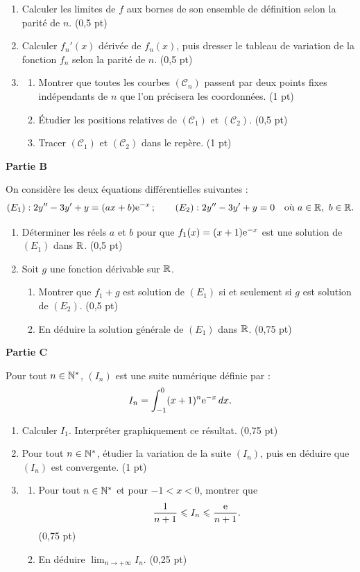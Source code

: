 \begin{enumerate}
	\item Calculer les limites de $f$ aux bornes de son ensemble de définition selon la parité de $n$. \hfill (0,5 pt)
	\item Calculer $f_n'(x)$ dérivée de $f_n(x)$, puis dresser le tableau de variation de la fonction $f_n$ selon la parité de $n$. \hfill (0,5 pt)
	\item
	\begin{enumerate}
		\item Montrer que toutes les courbes $(\mathscr{C}_n)$ passent par deux points fixes indépendants de $n$ que l'on précisera les coordonnées. \hfill (1 pt)
		\item Étudier les positions relatives de $(\mathscr{C}_1)$ et $(\mathscr{C}_2)$. \hfill (0,5 pt)
		\item Tracer $(\mathscr{C}_1)$ et $(\mathscr{C}_2)$ dans le repère. \hfill (1 pt)
	\end{enumerate}
\end{enumerate}

\medskip
\noindent\textbf{Partie B}

On considère les deux équations différentielles suivantes :
$$
(E_1) : 2y'' - 3y' + y = (ax+b)\mathrm{e}^{-x} \, ; \qquad (E_2) : 2y'' - 3y' + y = 0 \quad \text{où } a \in \mathbb{R},\ b \in \mathbb{R}.
$$

\begin{enumerate}
	\item Déterminer les réels $a$ et $b$ pour que $f_1(x) = (x+1)\mathrm{e}^{-x}$ est une solution de $(E_1)$ dans $\mathbb{R}$. \hfill (0,5 pt)
	\item Soit $g$ une fonction dérivable sur $\mathbb{R}$.
	\begin{enumerate}
		\item Montrer que $f_1 + g$ est solution de $(E_1)$ si et seulement si $g$ est solution de $(E_2)$. \hfill (0,5 pt)
		\item En déduire la solution générale de $(E_1)$ dans $\mathbb{R}$. \hfill (0,75 pt)
	\end{enumerate}
\end{enumerate}

\medskip
\noindent\textbf{Partie C}

Pour tout $n \in \mathbb{N}^*$, $(I_n)$ est une suite numérique définie par :
$$
I_n = \int_{-1}^{0} (x+1)^n \mathrm{e}^{-x}\,dx.
$$

\begin{enumerate}
	\item Calculer $I_1$. Interpréter graphiquement ce résultat. \hfill (0,75 pt)
	\item Pour tout $n \in \mathbb{N}^*$, étudier la variation de la suite $(I_n)$, puis en déduire que $(I_n)$ est convergente. \hfill (1 pt)
	\item
	\begin{enumerate}
		\item Pour tout $n \in \mathbb{N}^*$ et pour $-1 < x < 0$, montrer que
		$$
		\frac{1}{n+1} \leqslant I_n \leqslant \frac{\mathrm{e}}{n+1}.
		$$
		\hfill (0,75 pt)
		\item En déduire $\displaystyle\lim_{n\to+\infty} I_n$. \hfill (0,25 pt)
	\end{enumerate}
\end{enumerate}
